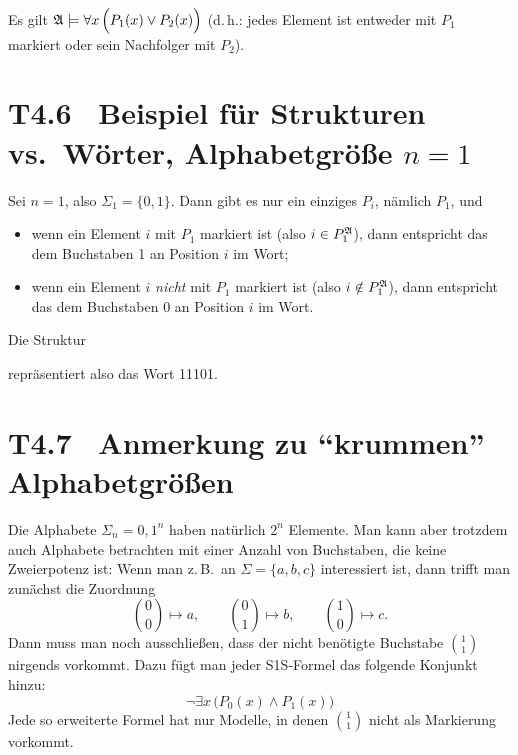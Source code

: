 \documentclass[fontsize=11pt, twoside=false, numbers=autoenddot]{scrbook}
\begin{document}
Es gilt $\mathfrak{A} \models \forall x\,\Big(P_1(x) \lor P_2(x)\Big)$
(d.\,h.: jedes Element ist entweder mit $P_1$ markiert oder sein Nachfolger mit $P_2$).

\section*{T4.6~ Beispiel für Strukturen vs.\ Wörter, Alphabetgröße {\boldmath $n=1$}}

Sei $n=1$, also $\Sigma_1 = \{0,1\}$. Dann gibt es nur ein einziges $P_i$, nämlich $P_1$, und
%
\begin{itemize}
  \item
    wenn ein Element $i$ mit $P_1$ markiert ist (also $i \in P_1^\mathfrak{A}$),
    dann entspricht das dem Buchstaben 1 an Position $i$ im Wort;
  \item
    wenn ein Element $i$ \emph{nicht} mit $P_1$ markiert ist (also $i \notin P_1^\mathfrak{A}$),
    dann entspricht das dem Buchstaben 0 an Position $i$ im Wort.
\end{itemize}
%
Die Struktur
\begin{center}
\end{center}
repräsentiert also das Wort 11101.

\section*{T4.7~ Anmerkung zu "`krummen"' Alphabetgrößen}

Die Alphabete $\Sigma_n = {0,1}^n$ haben natürlich $2^n$ Elemente.
Man kann aber trotzdem auch Alphabete betrachten mit einer Anzahl von Buchstaben, die keine Zweierpotenz ist:
Wenn man z.\,B.\ an $\Sigma = \{a,b,c\}$ interessiert ist,
dann trifft man zunächst die Zuordnung
\[
  \binom00 \mapsto a,\qquad
  \binom01 \mapsto b,\qquad
  \binom10 \mapsto c.
\]
Dann muss man noch ausschließen, dass der nicht benötigte Buchstabe $\binom11$ nirgends vorkommt.
Dazu fügt man jeder S1S-Formel das folgende Konjunkt hinzu:
\[
  \lnot \exists x\, \Big(P_0(x) \land P_1(x)\Big)
\]
Jede so erweiterte Formel hat nur Modelle, in denen $\binom11$ nicht als Markierung vorkommt.
\end{document}
